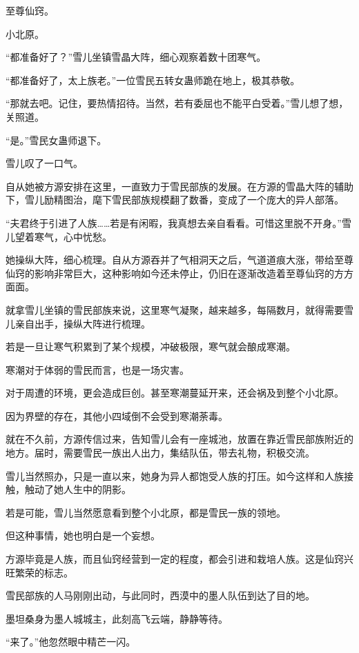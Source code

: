 
\begin{this_body}

至尊仙窍。

小北原。

“都准备好了？”雪儿坐镇雪晶大阵，细心观察着数十团寒气。

“都准备好了，太上族老。”一位雪民五转女蛊师跪在地上，极其恭敬。

“那就去吧。记住，要热情招待。当然，若有委屈也不能平白受着。”雪儿想了想，关照道。

“是。”雪民女蛊师退下。

雪儿叹了一口气。

自从她被方源安排在这里，一直致力于雪民部族的发展。在方源的雪晶大阵的辅助下，雪儿励精图治，麾下雪民部族规模翻了数番，变成了一个庞大的异人部落。

“夫君终于引进了人族……若是有闲暇，我真想去亲自看看。可惜这里脱不开身。”雪儿望着寒气，心中忧愁。

她操纵大阵，细心梳理。自从方源吞并了气相洞天之后，气道道痕大涨，带给至尊仙窍的影响非常巨大，这种影响如今还未停止，仍旧在逐渐改造着至尊仙窍的方方面面。

就拿雪儿坐镇的雪民部族来说，这里寒气凝聚，越来越多，每隔数月，就得需要雪儿亲自出手，操纵大阵进行梳理。

若是一旦让寒气积累到了某个规模，冲破极限，寒气就会酿成寒潮。

寒潮对于体弱的雪民而言，也是一场灾害。

对于周遭的环境，更会造成巨创。甚至寒潮蔓延开来，还会祸及到整个小北原。

因为界壁的存在，其他小四域倒不会受到寒潮荼毒。

就在不久前，方源传信过来，告知雪儿会有一座城池，放置在靠近雪民部族附近的地方。届时，需要雪民一族出人出力，集结队伍，带去礼物，积极交流。

雪儿当然照办，只是一直以来，她身为异人都饱受人族的打压。如今这样和人族接触，触动了她人生中的阴影。

若是可能，雪儿当然愿意看到整个小北原，都是雪民一族的领地。

但这种事情，她也明白是一个妄想。

方源毕竟是人族，而且仙窍经营到一定的程度，都会引进和栽培人族。这是仙窍兴旺繁荣的标志。

雪民部族的人马刚刚出动，与此同时，西漠中的墨人队伍到达了目的地。

墨坦桑身为墨人城城主，此刻高飞云端，静静等待。

“来了。”他忽然眼中精芒一闪。


\end{this_body}
